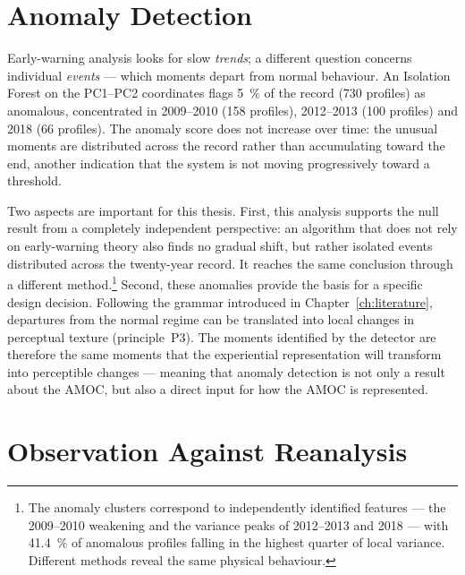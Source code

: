 \section{Anomaly Detection}
\label{sec:detect-anomalies}

Early-warning analysis looks for slow \emph{trends}; a different question concerns individual \emph{events} --- which moments depart from normal behaviour. An Isolation Forest on the PC1--PC2 coordinates flags \SI{5}{\percent} of the record (730 profiles) as anomalous, concentrated in 2009--2010 (158 profiles), 2012--2013 (100 profiles) and 2018 (66 profiles). The anomaly score does not increase over time: the unusual moments are distributed across the record rather than accumulating toward the end, another indication that the system is not moving progressively toward a threshold.



Two aspects are important for this thesis. First, this analysis supports the null result from a completely independent perspective: an algorithm that does not rely on early-warning theory also finds no gradual shift, but rather isolated events distributed across the twenty-year record. It reaches the same conclusion through a different method.\footnote{The anomaly clusters correspond to independently identified features --- the 2009--2010 weakening and the variance peaks of 2012--2013 and 2018 --- with \SI{41.4}{\percent} of anomalous profiles falling in the highest quarter of local variance. Different methods reveal the same physical behaviour.} Second, these anomalies provide the basis for a specific design decision. Following the grammar introduced in Chapter~\ref{ch:literature}, departures from the normal regime can be translated into local changes in perceptual texture (principle~P3). The moments identified by the detector are therefore the same moments that the experiential representation will transform into perceptible changes --- meaning that anomaly detection is not only a result about the AMOC, but also a direct input for how the AMOC is represented.

\section{Observation Against Reanalysis}
\label{sec:detect-copernicus}

